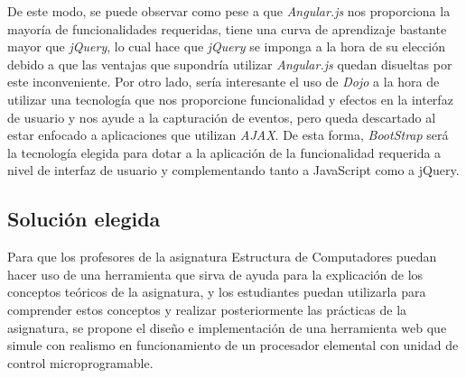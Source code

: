 \begin{table}[htbp]
\centering
\caption{Comparación de frameworks y bibliotecas.}
\label{tab:comparison_webframeworks}
\end{table}

De este modo, se puede observar como pese a que \textit{Angular.js} nos proporciona la mayoría de funcionalidades requeridas, tiene una curva de aprendizaje bastante mayor que \textit{jQuery}, lo cual hace que \textit{jQuery} se imponga a la hora de su elección debido a que las ventajas que supondría utilizar \textit{Angular.js} quedan disueltas por este inconveniente. Por otro lado, sería interesante el uso de \textit{Dojo} a la hora de utilizar una tecnología que nos proporcione funcionalidad y efectos en la interfaz de usuario y nos ayude a la capturación de eventos, pero queda descartado al estar enfocado a aplicaciones que utilizan \textit{AJAX}. De esta forma, \textit{BootStrap} será la tecnología elegida para dotar a la aplicación de la funcionalidad requerida a nivel de interfaz de usuario y complementando tanto a JavaScript como a jQuery.

\subsection{Solución elegida}
\label{sec:solution_selection}

Para que los profesores de la asignatura Estructura de Computadores puedan hacer uso de una herramienta que sirva de ayuda para la explicación de los conceptos teóricos de la asignatura, y los estudiantes puedan utilizarla para comprender estos conceptos y realizar posteriormente las prácticas de la asignatura, se propone el diseño e implementación de una herramienta web que simule con realismo en funcionamiento de un procesador elemental con unidad de control microprogramable.


